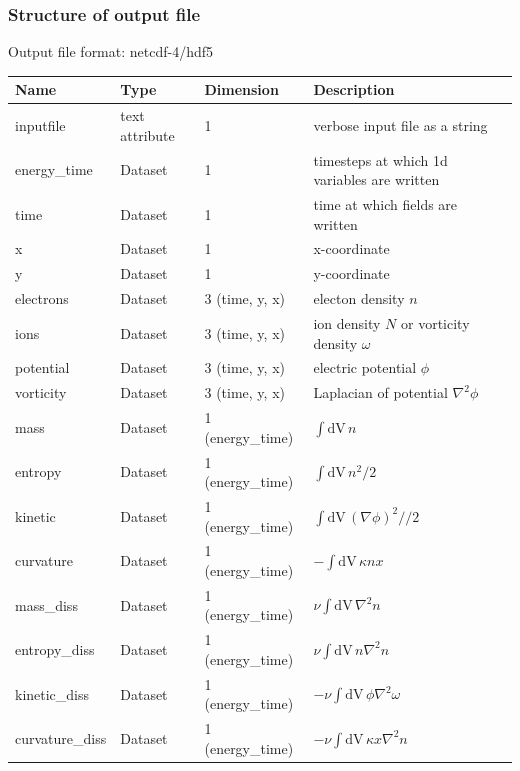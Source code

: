 \documentclass{hitec} %
\newcommand{\dV}{\mathrm{dV}\,}
\begin{document}
\subsubsection{Structure of output file}
Output file format: netcdf-4/hdf5
%
\begin{longtable}{lll>{\RaggedRight}p{7cm}}
\toprule
\rowcolor{gray!50}\textbf{Name} &  \textbf{Type} & \textbf{Dimension} & \textbf{Description}  \\ \midrule
inputfile  &             text attribute & 1 & verbose input file as a string \\
energy\_time             & Dataset & 1 & timesteps at which 1d variables are written \\
time                     & Dataset & 1 & time at which fields are written \\
x                        & Dataset & 1 & x-coordinate  \\
y                        & Dataset & 1 & y-coordinate \\
electrons                & Dataset & 3 (time, y, x) & electon density $n$ \\
ions                     & Dataset & 3 (time, y, x) & ion density $N$ or vorticity density $\omega$  \\
potential                & Dataset & 3 (time, y, x) & electric potential $\phi$  \\
vorticity                & Dataset & 3 (time, y, x) & Laplacian of potential $\nabla^2\phi$  \\
mass                     & Dataset & 1 (energy\_time) & $\int\dV n$  \\
entropy                  & Dataset & 1 (energy\_time) & $\int\dV n^2/2$  \\
kinetic                  & Dataset & 1 (energy\_time) & $\int\dV (\nabla\phi)^2//2$  \\
curvature                & Dataset & 1 (energy\_time) & $-\int\dV \kappa n x$ \\
mass\_diss               & Dataset & 1 (energy\_time) & $\nu \int\dV \nabla^2 n $  \\
entropy\_diss            & Dataset & 1 (energy\_time) & $\nu \int\dV n\nabla^2 n$  \\
kinetic\_diss            & Dataset & 1 (energy\_time) & $-\nu\int\dV\phi \nabla^2 \omega$  \\
curvature\_diss          & Dataset & 1 (energy\_time) & $-\nu\int\dV \kappa x \nabla^2 n$   \\
\bottomrule
\end{longtable}
\end{document}
